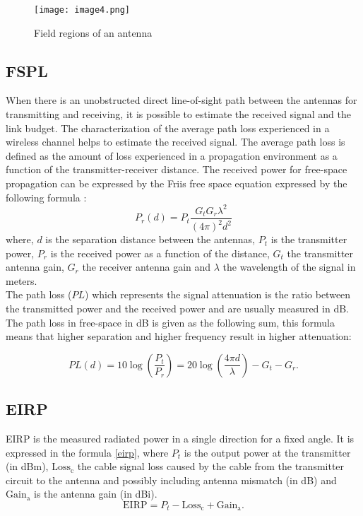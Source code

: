 %
\begin{figure}[H]
\centering
\texttt{[image: image4.png]}
\caption{\label{regions} Field regions of an antenna \cite{balanis}}
\end{figure}




\subsection{\acf{FSPL}}
When there is an unobstructed direct line-of-sight path between the antennas for transmitting and receiving, it is possible to estimate the received signal and the link budget. The characterization of the average path loss experienced in a wireless channel helps to estimate the received signal. The average path loss is defined as the amount of loss experienced in a propagation environment as a function of the transmitter-receiver distance. The received power for free-space propagation can be expressed by the Friis free space equation expressed by the following formula \cite{schantz}:
\begin{equation}
P_{r} \left( d \right) = P_{t}\frac{G_{t}G_{r} \lambda ^{2}}{ \left( 4 \pi  \right) ^{2}d^{2}} 
\end{equation}
where, $d$ is the separation distance between the antennas,  $P_{t}$ is the transmitter power, $P_{r}$ is the received power as a function of the distance, $G_{t}$ the transmitter antenna gain, $G_{r}$ the receiver antenna gain and $\lambda$ the wavelength of the signal in meters. \\

The path loss ($PL$) which represents the signal attenuation is the ratio between the transmitted power and the received power and are usually measured in dB. The path loss in free-space in dB is given as the following sum, this formula means that higher separation and higher frequency result in higher attenuation:

\begin{equation} 
PL \left( d \right) =10\log(\frac{P_{t}}{P_{r}})  =20\log \left( \frac{4 \pi d}{ \lambda } \right) -G_{t}-G_{r}.
\end{equation}

\subsection{\acf{EIRP}}
\acs{EIRP} is the measured radiated power in a single direction for a fixed angle. It is expressed in the formula \ref{eirp}, where $P_{t}$ is the output power at the transmitter (in dBm), $\mbox{Loss}_{\mbox{c}}$ the cable signal loss caused by the cable from the transmitter circuit to the antenna and possibly including antenna mismatch (in dB) and $\mbox{Gain}_{\mbox{a}}$ is the antenna gain (in dBi).
\begin{equation}
\mbox{EIRP} =  P_{t} - \mbox{Loss}_{\mbox{c}}+  \mbox{Gain}_{\mbox{a}}. \label{eirp}
\end{equation}
  
